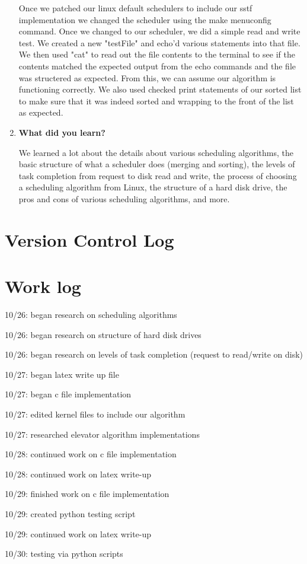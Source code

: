 \documentclass[onecolumn, draftclsnofoot,10pt, compsoc]{IEEEtran}
\begin{document}
\begin{enumerate}
		Once we patched our linux default schedulers to include our sstf implementation we changed the scheduler using the make menuconfig command.
		Once we changed to our scheduler, we did a simple read and write test. We created a new "testFile" and echo'd various statements into that file.
		We then used "cat" to read out the file contents to the terminal to see if the contents matched the expected output from the echo commands and
		the file was structered as expected. From this, we can assume our algorithm is functioning correctly. We also used checked print statements 
		of our sorted list to make sure that it was indeed sorted and wrapping to the front of the list as expected. 
	
		\item \textbf{What did you learn?}
	
		We learned a lot about the details about various scheduling algorithms, the basic structure of what a scheduler
		does (merging and sorting), the levels of task completion from request to disk read and write, the process
		of choosing a scheduling algorithm from Linux, the structure of a hard disk drive, the pros and cons 
		of various scheduling algorithms, and more. 
		
	\end{enumerate}
	
\section{Version Control Log}



\section{Work log}

	10/26: began research on scheduling algorithms
	
	10/26: began research on structure of hard disk drives
	
	10/26: began research on levels of task completion (request to read/write on disk)
	
	10/27: began latex write up file
	
	10/27: began c file implementation
	
	10/27: edited kernel files to include our algorithm
	
	10/27: researched elevator algorithm implementations
	
	10/28: continued work on c file implementation
	
	10/28: continued work on latex write-up
	
	10/29: finished work on c file implementation
	
	10/29: created python testing script
	
	10/29: continued work on latex write-up
	
	10/30: testing via python scripts
\end{document}

